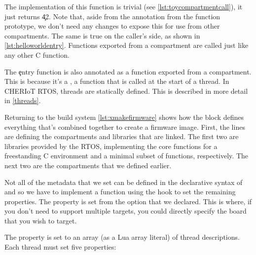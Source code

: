 \codelisting[filename=examples/hello_world/hello.h,marker=export,label=lst:helloexport,caption="Exporting a function for use by other compartments"]{}

The implementation of this function is trivial (see \ref{lst:toycompartmentcall}), it just returns \c{42}.
Note that, aside from the annotation from the function prototype, we don't need any changes to expose this for use from other compartments.
The same is true on the caller's side, as shown in \ref{lst:helloworldentry}.
Functions exported from a compartment are called just like any other C function.

\codelisting[filename=examples/hello_world/compartment.cc,marker=all,label=lst:toycompartmentcall,caption="A trivial implementation of an exported function"]{}

\codelisting[filename=examples/hello_world/hello.cc,marker=entry,label=lst:helloworldentry,caption="A simple compartment entry point that does a cross-compartment call"]{}

The \c{entry} function is also annotated as a function exported from a compartment.
This is because it's a , a function that is called at the start of a thread.
In CHERIoT RTOS, threads are statically defined.
This is described in more detail in \ref{threads}.

Returning to the build system \ref{lst:xmakefirmware} shows how the  block defines everything that's combined together to create a firmware image.
First, the  lines are defining the compartments and libraries that are linked.
The first two are libraries provided by the RTOS, implementing the core functions for a freestanding C environment and a minimal subset of  functions, respectively.
The next two are the compartments that we defined earlier.

Not all of the metadata that we set can be defined in the declarative syntax of  and so we have to implement a function using the  hook to set the remaining properties.
The  property is set from the option that we declared.
This is where, if you don't need to support multiple targets, you could directly specify the board that you wish to target.

\lualisting[filename=examples/hello_world/xmake.lua,marker=firmware,label=lst:xmakefirmware,caption="Build system code for linking the final firmware image"]{}

The  property is set to an array (as a Lua array literal) of thread descriptions.
Each thread must set five properties:

